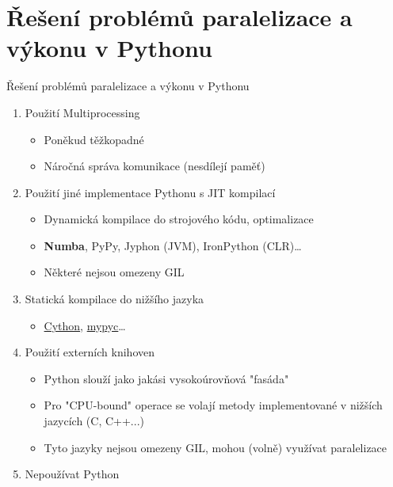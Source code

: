 \documentclass{beamer}
\begin{document}
\section{Řešení problémů paralelizace a výkonu v Pythonu}
\begin{frame}{Řešení problémů paralelizace a výkonu v Pythonu}
  \begin{enumerate}
    \item Použití Multiprocessing 
    \begin{itemize}
      \item [\textendash] Poněkud těžkopadné
      \item [\textendash] Náročná správa komunikace (nesdílejí paměť)
    \end{itemize}

    \item Použití jiné implementace Pythonu s JIT kompilací
    \begin{itemize}
      \item [\textendash] Dynamická kompilace do strojového kódu, optimalizace
      \item [\textendash] \textbf{Numba}, PyPy, Jyphon (JVM), IronPython (CLR)\dots
      \item [\textendash] Některé nejsou omezeny GIL
    \end{itemize}

    \item Statická kompilace do nižšího jazyka
    \begin{itemize}
      \item [\textendash] \href{https://cython.org/}{Cython}, \href{https://github.com/mypyc/mypyc}{mypyc}\dots
    \end{itemize}

    \item Použití externích knihoven
    \begin{itemize}
      \item [\textendash] Python slouží jako jakási vysokoúrovňová "fasáda"
      \item [\textendash] Pro "CPU-bound" operace se volají metody implementované v nižších jazycích (C, C++...)
      \item [\textendash] Tyto jazyky nejsou omezeny GIL, mohou (volně) využívat paralelizace
    \end{itemize}

    \item Nepoužívat Python
  \end{enumerate}
\end{frame}
\end{document}
